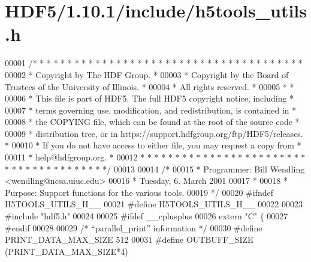 \hypertarget{_h_d_f5_21_810_81_2include_2h5tools__utils_8h_source}{}\section{H\+D\+F5/1.10.1/include/h5tools\+\_\+utils.h}
\label{_h_d_f5_21_810_81_2include_2h5tools__utils_8h_source}

\begin{DoxyCode}
00001 \textcolor{comment}{/* * * * * * * * * * * * * * * * * * * * * * * * * * * * * * * * * * * * * * *}
00002 \textcolor{comment}{ * Copyright by The HDF Group.                                               *}
00003 \textcolor{comment}{ * Copyright by the Board of Trustees of the University of Illinois.         *}
00004 \textcolor{comment}{ * All rights reserved.                                                      *}
00005 \textcolor{comment}{ *                                                                           *}
00006 \textcolor{comment}{ * This file is part of HDF5.  The full HDF5 copyright notice, including     *}
00007 \textcolor{comment}{ * terms governing use, modification, and redistribution, is contained in    *}
00008 \textcolor{comment}{ * the COPYING file, which can be found at the root of the source code       *}
00009 \textcolor{comment}{ * distribution tree, or in https://support.hdfgroup.org/ftp/HDF5/releases.  *}
00010 \textcolor{comment}{ * If you do not have access to either file, you may request a copy from     *}
00011 \textcolor{comment}{ * help@hdfgroup.org.                                                        *}
00012 \textcolor{comment}{ * * * * * * * * * * * * * * * * * * * * * * * * * * * * * * * * * * * * * * */}
00013 
00014 \textcolor{comment}{/*}
00015 \textcolor{comment}{ * Programmer:  Bill Wendling <wendling@ncsa.uiuc.edu>}
00016 \textcolor{comment}{ *              Tuesday, 6. March 2001}
00017 \textcolor{comment}{ *}
00018 \textcolor{comment}{ * Purpose:     Support functions for the various tools.}
00019 \textcolor{comment}{ */}
00020 \textcolor{preprocessor}{#ifndef H5TOOLS\_UTILS\_H\_\_}
00021 \textcolor{preprocessor}{#define H5TOOLS\_UTILS\_H\_\_}
00022 
00023 \textcolor{preprocessor}{#include "hdf5.h"}
00024 
00025 \textcolor{preprocessor}{#ifdef \_\_cplusplus}
00026 \textcolor{keyword}{extern} \textcolor{stringliteral}{"C"} \{
00027 \textcolor{preprocessor}{#endif}
00028 
00029 \textcolor{comment}{/* ``parallel\_print'' information */}
00030 \textcolor{preprocessor}{#define PRINT\_DATA\_MAX\_SIZE     512}
00031 \textcolor{preprocessor}{#define OUTBUFF\_SIZE        (PRINT\_DATA\_MAX\_SIZE*4)}

\end{DoxyCode}

